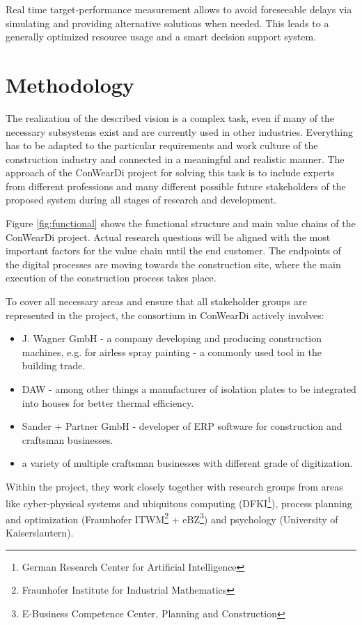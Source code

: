 Real time target-performance measurement allows to avoid foreseeable delays via simulating and providing alternative solutions when needed. This leads to a generally optimized resource usage and a smart decision support system.


\section{Methodology}
The realization of the described vision is a complex task, even if many of the necessary subsystems exist and are currently used in other industries. 
Everything has to be adapted to the particular requirements and work culture of the construction industry and connected in a meaningful and realistic manner. 
The approach of the ConWearDi project for solving this task is to include experts from different professions and many different possible future stakeholders of the proposed system during all stages of research and development.
 
Figure \ref{fig:functional} shows the functional structure and main value chains of the ConWearDi project. Actual research questions will be aligned with the most important factors for the value chain until the end customer. 
The endpoints of the digital processes are moving towards the construction site, where the main execution of the construction process takes place.

To cover all necessary areas and ensure that all stakeholder groups are represented in the project, the consortium in ConWearDi actively involves:
\begin{itemize}
  \item J. Wagner GmbH - a company developing and producing construction machines, e.g. for airless spray painting - a commonly used tool in the building trade.
  \item DAW - among other things a manufacturer of isolation plates to be integrated into houses for better thermal efficiency.
  \item Sander + Partner GmbH - developer of ERP software for construction and craftsman businesses.
  \item a variety of multiple craftsman businesses with different grade of digitization.
\end{itemize}
Within the project, they work closely together with research groups from areas like cyber-physical systems and ubiquitous computing (DFKI\footnote{German Research Center for Artificial Intelligence}), process planning and optimization (Fraunhofer ITWM\footnote{Fraunhofer Institute for Industrial Mathematics} + eBZ\footnote{E-Business Competence Center, Planning and Construction}) and psychology (University of Kaiserslautern).

